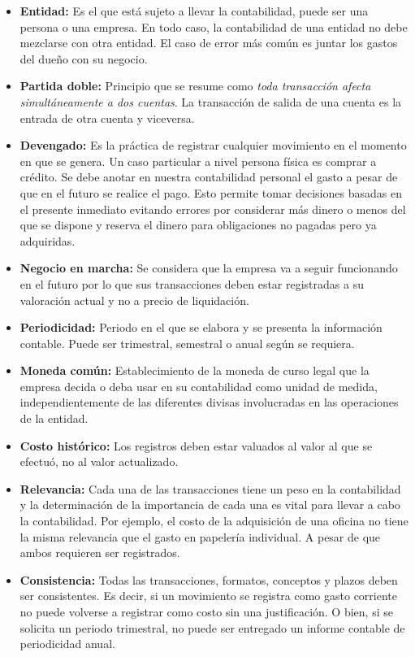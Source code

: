 \documentclass[letterpaper, 12pt]{article}
\begin{document}
		\begin{itemize}

		\item \textbf{Entidad:} Es el que está sujeto a llevar la contabilidad, puede ser una persona o una empresa. En todo caso, la contabilidad de una entidad no debe mezclarse con otra entidad. El caso de error más común es juntar los gastos del dueño con su negocio.
		\item \textbf{Partida doble:} Principio que se resume como \emph{toda transacción afecta simultáneamente a dos cuentas}. La transacción de salida de una cuenta es la entrada de otra cuenta y viceversa.
		\item \textbf{Devengado:} Es la práctica de registrar cualquier movimiento en el momento en que se genera. Un caso particular a nivel persona física es comprar a crédito. Se debe anotar en nuestra contabilidad personal el gasto a pesar de que en el futuro se realice el pago. Esto permite tomar decisiones basadas en el presente inmediato evitando errores por considerar más dinero o menos del que se dispone y reserva el dinero para obligaciones no pagadas pero ya adquiridas.
		\item \textbf{Negocio en marcha:} Se considera que la empresa va a seguir funcionando en el futuro por lo que sus transacciones deben estar registradas a su valoración actual y no a precio de liquidación.
		\item \textbf{Periodicidad:} Periodo en el que se elabora y se presenta la información contable. Puede ser trimestral, semestral o anual según se requiera.
		\item \textbf{Moneda común:} Establecimiento de la moneda de curso legal que la empresa decida o deba usar en su contabilidad como unidad de medida, independientemente de las diferentes divisas involucradas en las operaciones de la entidad.
		\item \textbf{Costo histórico:} Los registros deben estar valuados al valor al que se efectuó, no al valor actualizado.
		\item \textbf{Relevancia:} Cada una de las transacciones tiene un peso en la contabilidad y la determinación de la importancia de cada una es vital para llevar a cabo la contabilidad. Por ejemplo, el costo de la adquisición de una oficina no tiene la misma relevancia que el gasto en papelería individual. A pesar de que ambos requieren ser registrados.
		\item \textbf{Consistencia:} Todas las transacciones, formatos, conceptos y plazos deben ser consistentes. Es decir, si un movimiento se registra como gasto corriente no puede volverse a registrar como costo sin una justificación. O bien, si se solicita un periodo trimestral, no puede ser entregado un informe contable de periodicidad anual.

\end{itemize}
\end{document}
